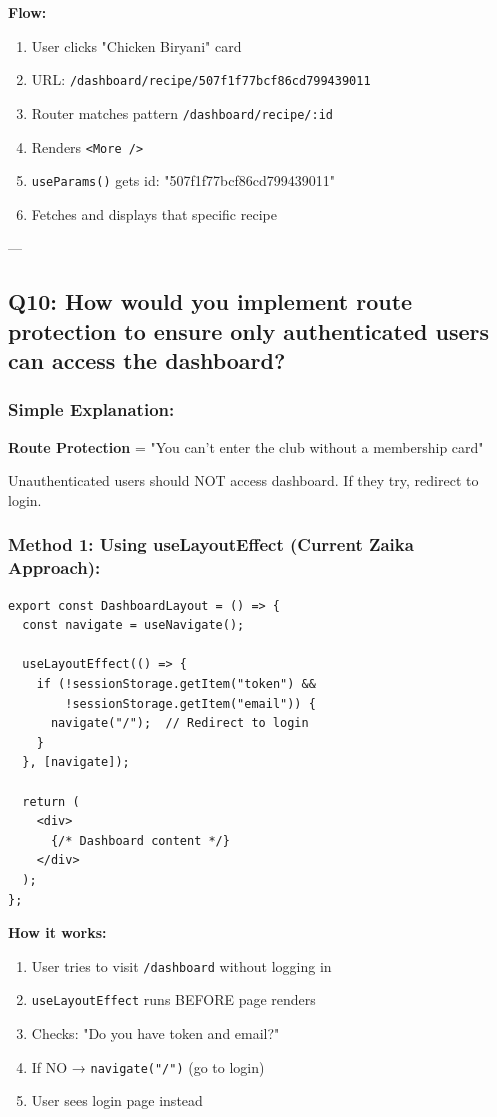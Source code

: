 \documentclass[12pt]{article}
\begin{document}
\textbf{Flow:}

\begin{enumerate}
    \item User clicks "Chicken Biryani" card
    \item URL: \texttt{/dashboard/recipe/507f1f77bcf86cd799439011}
    \item Router matches pattern \texttt{/dashboard/recipe/:id}
    \item Renders \texttt{<More />}
    \item \texttt{useParams()} gets id: "507f1f77bcf86cd799439011"
    \item Fetches and displays that specific recipe
\end{enumerate}

---

\subsection{Q10: How would you implement route protection to ensure only authenticated users can access the dashboard?}

\subsubsection*{Simple Explanation:}

\textbf{Route Protection} = "You can't enter the club without a membership card"

Unauthenticated users should NOT access dashboard. If they try, redirect to login.

\subsubsection*{Method 1: Using useLayoutEffect (Current Zaika Approach):}

\begin{lstlisting}
export const DashboardLayout = () => {
  const navigate = useNavigate();
  
  useLayoutEffect(() => {
    if (!sessionStorage.getItem("token") && 
        !sessionStorage.getItem("email")) {
      navigate("/");  // Redirect to login
    }
  }, [navigate]);
  
  return (
    <div>
      {/* Dashboard content */}
    </div>
  );
};
\end{lstlisting}

\textbf{How it works:}

\begin{enumerate}
    \item User tries to visit \texttt{/dashboard} without logging in
    \item \texttt{useLayoutEffect} runs BEFORE page renders
    \item Checks: "Do you have token and email?"
    \item If NO → \texttt{navigate("/")} (go to login)
    \item User sees login page instead
\end{enumerate}
\end{document}
